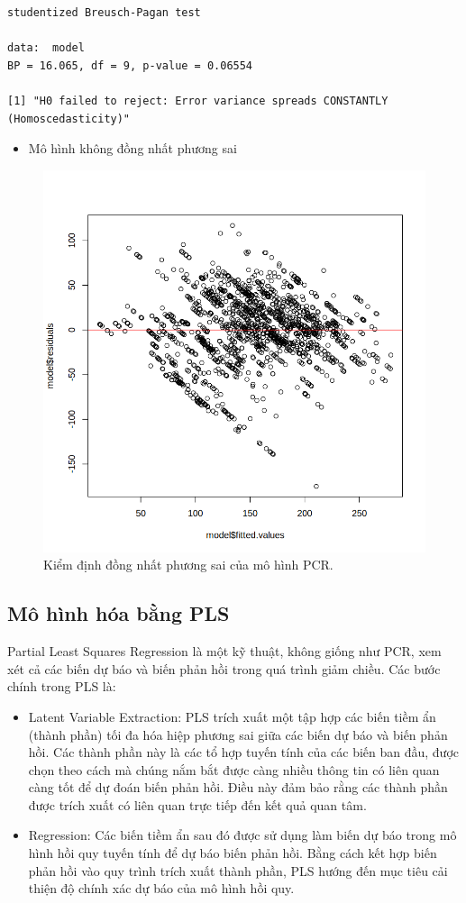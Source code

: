 \begin{lstlisting}
studentized Breusch-Pagan test

data:  model
BP = 16.065, df = 9, p-value = 0.06554

[1] "H0 failed to reject: Error variance spreads CONSTANTLY (Homoscedasticity)"
\end{lstlisting}
\begin{itemize}
    \item Mô hình không đồng nhất phương sai
\end{itemize}
\begin{figure}[H]
    \centering
    \includegraphics[width=0.75\columnwidth]{csm_figures/pcr_homo_test.png}
    \caption{Kiểm định đồng nhất phương sai của mô hình PCR.}
    \label{fig:pcr_homo_test}
\end{figure}

\subsection{Mô hình hóa bằng PLS}

Partial Least Squares Regression là một kỹ thuật, không giống như PCR, xem xét cả các biến dự báo và biến phản hồi trong quá trình giảm chiều. Các bước chính trong PLS là:
\begin{itemize}
    \item Latent Variable Extraction: PLS trích xuất một tập hợp các biến tiềm ẩn (thành phần) tối đa hóa hiệp phương sai giữa các biến dự báo và biến phản hồi. Các thành phần này là các tổ hợp tuyến tính của các biến ban đầu, được chọn theo cách mà chúng nắm bắt được càng nhiều thông tin có liên quan càng tốt để dự đoán biến phản hồi. Điều này đảm bảo rằng các thành phần được trích xuất có liên quan trực tiếp đến kết quả quan tâm.
    \item Regression: Các biến tiềm ẩn sau đó được sử dụng làm biến dự báo trong mô hình hồi quy tuyến tính để dự báo biến phản hồi. Bằng cách kết hợp biến phản hồi vào quy trình trích xuất thành phần, PLS hướng đến mục tiêu cải thiện độ chính xác dự báo của mô hình hồi quy.
\end{itemize}

